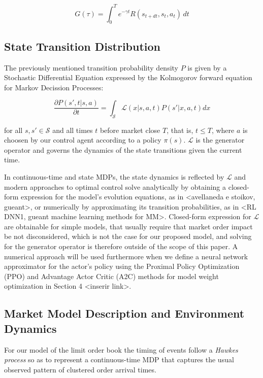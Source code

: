 \begin{equation}
G(\tau) = \int_0^T e^{-\gamma t} R(s_{t+dt}, s_t, a_t) \, dt
\end{equation}



\subsection{State Transition Distribution}

The previously mentioned transition probability density $P$ is given by a Stochastic Differential Equation expressed by the Kolmogorov forward equation for Markov Decission Processes:

\begin{equation}
	\frac{\partial P(s', t | s, a)}{\partial t}  = \int_{\mathcal{S}} \mathcal{L}(x | s, a, t) P(s'| x, a, t) dx
\end{equation}

for all $s, s' \in \mathcal{S}$ and all times $t$ before market close $T$, that is, $t \le T$, where $a$ is choosen by our control agent according to a policy $\pi (s)$. $\mathcal{L}$ is the generator operator and governs the dynamics of the state transitions given the current time. 

In continuous-time and state MDPs, the state dynamics is reflected by $\mathcal{L}$ and modern approaches to optimal control solve analytically by obtaining a closed-form expression for the model's evolution equations, as in <avellaneda e stoikov, gueant>, or numerically by approximating its transition probabilities, as in <RL DNN1, gueant machine learning methods for MM>. Closed-form expression for $\mathcal{L}$ are obtainable for simple models, that usually require that market order impact be not disconsidered, which is not the case for our proposed model, and solving for the generator operator is therefore outside of the scope of this paper. A numerical approach will be used furthermore when we define a neural network approximator for the actor's policy using the Proximal Policy Optimization (PPO) and Advantage Actor Critic (A2C) methods for model weight optimization in Section 4 <inserir link>.

\subsection{Market Model Description and Environment Dynamics}

For our model of the limit order book the timing of events follow a \textit{Hawkes process} so as to represent a continuous-time MDP that captures the usual observed pattern of clustered order arrival times.

